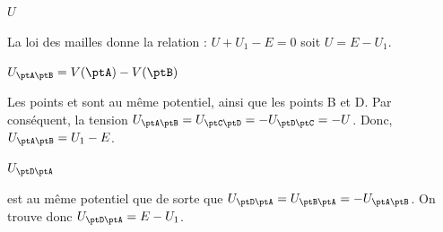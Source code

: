 \begin{enonce}
$U$
\end{enonce}


\begin{corrige} 
	La loi des mailles donne la relation : $U+U_1-E=0$ soit $U=E-U_1$.
\end{corrige}




\begin{enonce}
$U_{\ptA\ptB}=V(\ptA)-V(\ptB)$
\end{enonce}


\begin{corrige}
	Les points \ptA et \ptC sont au même potentiel, ainsi que les points B et D. Par conséquent, la tension $U_{\ptA\ptB}=U_{\ptC\ptD}=-U_{\ptD\ptC}=-U$. Donc, $U_{\ptA\ptB}=U_1-E$.
\end{corrige}




\begin{enonce}
$U_{\ptD\ptA}$
\end{enonce}


\begin{corrige}
	\ptD est au même potentiel que \ptB de sorte que $U_{\ptD\ptA}=U_{\ptB\ptA}=-U_{\ptA\ptB}$. On trouve donc $U_{\ptD\ptA}=E-U_1$.
\end{corrige}


\finEntrainement



